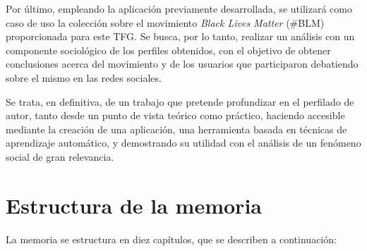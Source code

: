 \bigskip
Por último, empleando la aplicación previamente desarrollada, se utilizará como caso de uso la colección sobre el movimiento
\textit{Black Lives Matter} (\#BLM) proporcionada para este TFG. Se busca, por lo tanto, realizar un análisis con un componente sociológico
de los perfiles obtenidos,
con el objetivo de obtener conclusiones acerca del movimiento y de los usuarios que participaron debatiendo sobre el mismo en las redes sociales.

\bigskip
Se trata, en definitiva, de un trabajo que pretende profundizar en el perfilado de autor, tanto desde un punto de vista teórico como práctico,
haciendo accesible mediante la creación de una aplicación, una herramienta basada en técnicas de aprendizaje automático, y
demostrando su utilidad con el análisis de un fenómeno social de gran relevancia.

\section{Estructura de la memoria}
\label{sec:intro_estructura}

La memoria se estructura en diez capítulos, que se describen a continuación:

